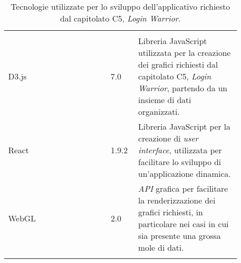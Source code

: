 {\begin{longtable}{>{\raggedright\arraybackslash}m{0.40\linewidth}m{0.10\linewidth}m{0.40\linewidth}}
    \rowcolor[RGB]{47, 106, 73}
    \multicolumn{3}{>{\centering\arraybackslash}m{0.953\linewidth}}{\textcolor{white}{\textbf{Librerie e Framework}}}\\ 

    \rowcolor[RGB]{216, 235, 171}
    D3.js & 7.0 & Libreria JavaScript utilizzata per la creazione dei grafici richiesti dal capitolato C5, \textit{Login Warrior}, partendo da un insieme di dati organizzati.\\

    \rowcolor[RGB]{233, 245, 206}
    React & 1.9.2 & Libreria JavaScript per la creazione di \textit{user interface}, utilizzata per facilitare lo sviluppo di un'applicazione dinamica.\\

    \rowcolor[RGB]{216, 235, 171}
    WebGL & 2.0 & \textit{API} grafica per facilitare la renderizzazione dei grafici richiesti, in particolare nei casi in cui sia presente una grossa mole di dati.\\

    \caption{Tecnologie utilizzate per lo sviluppo dell'applicativo richiesto dal capitolato C5, \textit{Login Warrior}.}
\end{longtable}
}


